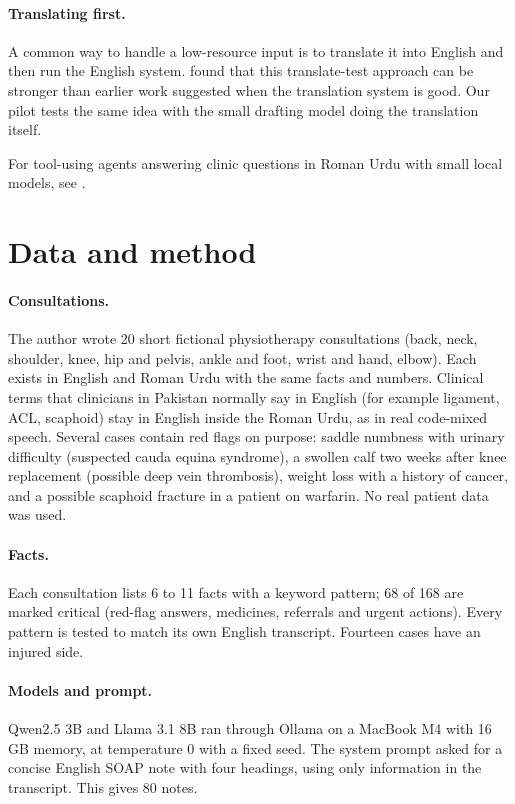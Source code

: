 \documentclass[11pt]{article}
\begin{document}
\paragraph{Translating first.} A common way to handle a low-resource input is to translate it into English and then run the English system. \citet{artetxe2023revisiting} found that this translate-test approach can be stronger than earlier work suggested when the translation system is good. Our pilot tests the same idea with the small drafting model doing the translation itself.

For tool-using agents answering clinic questions in Roman Urdu with small local models, see \citet{hussain2026react}.

\section{Data and method}
\paragraph{Consultations.} The author wrote 20 short fictional physiotherapy consultations (back, neck, shoulder, knee, hip and pelvis, ankle and foot, wrist and hand, elbow). Each exists in English and Roman Urdu with the same facts and numbers. Clinical terms that clinicians in Pakistan normally say in English (for example ligament, ACL, scaphoid) stay in English inside the Roman Urdu, as in real code-mixed speech. Several cases contain red flags on purpose: saddle numbness with urinary difficulty (suspected cauda equina syndrome), a swollen calf two weeks after knee replacement (possible deep vein thrombosis), weight loss with a history of cancer, and a possible scaphoid fracture in a patient on warfarin. No real patient data was used.

\paragraph{Facts.} Each consultation lists 6 to 11 facts with a keyword pattern; 68 of 168 are marked critical (red-flag answers, medicines, referrals and urgent actions). Every pattern is tested to match its own English transcript. Fourteen cases have an injured side.

\paragraph{Models and prompt.} Qwen2.5 3B \citep{qwen2025qwen25} and Llama 3.1 8B \citep{grattafiori2024llama3} ran through Ollama on a MacBook M4 with 16\,GB memory, at temperature 0 with a fixed seed. The system prompt asked for a concise English SOAP note with four headings, using only information in the transcript. This gives 80 notes.
\end{document}
